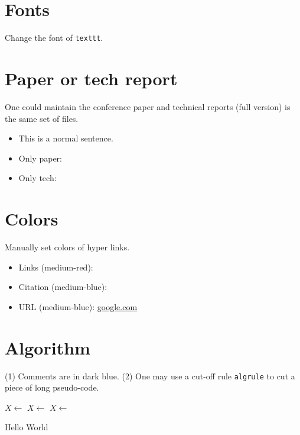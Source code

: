 \section{Fonts}

Change the font of \texttt{texttt}.

\section{Paper or tech report}

One could maintain the conference paper and technical reports (full version) is
the same set of files.

\begin{itemize}
\item This is a normal sentence.
\item Only paper: 
\item Only tech: 
\end{itemize}

\section{Colors}\label{sec:color}

Manually set colors of hyper links.

\begin{itemize}
\item Links (medium-red): 
\item Citation (medium-blue): \cite{lin2017boosting}
\item URL (medium-blue): \url{google.com}
\end{itemize}

\section{Algorithm}

(1) Comments are in dark blue. (2) One may use a cut-off rule \texttt{algrule}
to cut a piece of long pseudo-code.

\begin{algorithm}
  $X\leftarrow$ \MyFunc{}  \label{algo:l1}%
  $X\leftarrow$ \MyFunc{}\;%
  $X\leftarrow$ \MyFunc{}\label{algo:l3}\;%
  \algrule %
  \caption{Hello World} \label{algo:findcp}
\end{algorithm}

